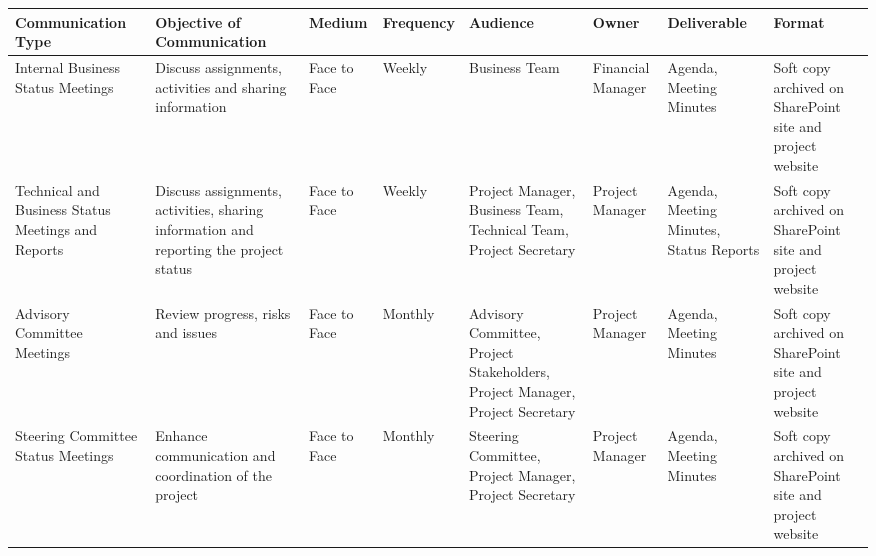 \begin{landscape}
	
	
	\begin{longtable}{| >{\raggedright\arraybackslash}p{2.8cm}  | >{\raggedright\arraybackslash}p{2.8cm} | >{\raggedright\arraybackslash}p{2cm} | >{\raggedright\arraybackslash}p{2cm} | >{\raggedright\arraybackslash}p{2cm} | >{\raggedright\arraybackslash}p{2.4cm} | >{\raggedright\arraybackslash}p{2.4cm} | >{\raggedright\arraybackslash}p{2.4cm} |  }
		
		
		\toprule [2pt]
		
		\textbf{Communication Type} & \textbf{Objective of Communication} & \textbf{Medium}  &\textbf{Frequency} &\textbf{Audience}& \textbf{Owner}& \textbf{Deliverable} &\textbf{Format} \\  
		
		\midrule [1.5pt]
		\endhead
		
		Internal Business Status Meetings& Discuss assignments, activities and sharing information  & Face to Face   &  Weekly &Business Team     & Financial Manager  & Agenda, Meeting Minutes  &Soft copy archived on SharePoint site and project website\\  
		
		\hline
		
		Technical and Business Status Meetings and Reports&Discuss assignments, activities, sharing information and reporting the project status   &Face to Face    & Weekly  & Project Manager, Business Team, Technical Team, Project Secretary    &Project Manager   & Agenda, Meeting Minutes, Status Reports  &Soft copy archived on SharePoint site and project website\\  
		
		\hline
		
		Advisory Committee Meetings& Review progress, risks and issues  & Face to Face   &Monthly   &  Advisory Committee, Project Stakeholders, Project Manager, Project Secretary   &Project Manager   & Agenda, Meeting Minutes  &Soft copy archived on SharePoint site and project website\\  
		
		\hline
		
		Steering Committee Status Meetings& Enhance communication and coordination of the project  & Face to Face   & Monthly  & Steering Committee, Project Manager, Project Secretary    &  Project Manager & Agenda, Meeting Minutes  &Soft copy archived on SharePoint site and project website\\  
		

\end{longtable}
\end{landscape}
